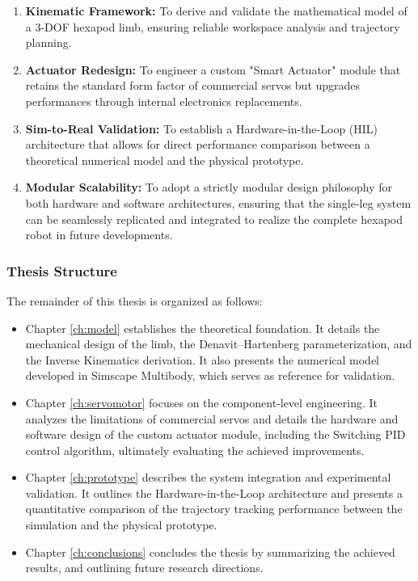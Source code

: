 \begin{enumerate}
    \item \textbf{Kinematic Framework:} To derive and validate the mathematical model of a 3-DOF hexapod limb,
        ensuring reliable workspace analysis and trajectory planning.
    \item \textbf{Actuator Redesign:} To engineer a custom "Smart Actuator" module that retains the standard form factor
        of commercial servos but upgrades performances through internal electronics replacements.
    \item \textbf{Sim-to-Real Validation:} To establish a Hardware-in-the-Loop (HIL) architecture that allows for direct
        performance comparison between a theoretical numerical model and the physical prototype.
    \item \textbf{Modular Scalability:} To adopt a strictly modular design philosophy for both hardware and software
        architectures, ensuring that the single-leg system can be seamlessly replicated and integrated to realize the
        complete hexapod robot in future developments.
\end{enumerate}


\subsubsection{Thesis Structure}

The remainder of this thesis is organized as follows:

\begin{itemize}
    \item Chapter \ref{ch:model} establishes the theoretical foundation. It details the mechanical design of the limb,
        the Denavit--Hartenberg parameterization, and the Inverse Kinematics derivation. It also presents the
        numerical model developed in Simscape Multibody, which serves as reference for validation.
    \item Chapter \ref{ch:servomotor} focuses on the component-level engineering. It analyzes the limitations of
        commercial servos and details the hardware and software design of the custom actuator module, including the
        Switching PID control algorithm, ultimately evaluating the achieved improvements.
    \item Chapter \ref{ch:prototype} describes the system integration and experimental validation. It outlines the
        Hardware-in-the-Loop architecture and presents a quantitative comparison of the trajectory tracking performance
        between the simulation and the physical prototype.
    \item Chapter \ref{ch:conclusions} concludes the thesis by summarizing the achieved results, and outlining future
        research directions.
\end{itemize}


